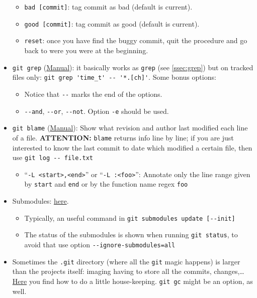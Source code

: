 \documentclass[a4paper,12pt,%
              final%
              ]{article}
\begin{document}
\begin{itemize}
\begin{itemize}
      \item \verb|bad [commit]|: tag commit as bad (default is current).
      \item \verb|good [commit]|: tag commit as good (default is current).
      \item \verb|reset|: once you have find the buggy commit, quit the procedure and go back to were you were at the beginning.
    \end{itemize}
  \item \verb|git grep| (\href{https://git-scm.com/docs/git-grep}{Manual}): it basically works as \verb|grep| (see \autoref{ssec:grep}) but on tracked files only: \verb|git grep 'time_t' -- '*.[ch]'|. Some bonus options:
    \begin{itemize}
      \item Notice that \verb|--| marks the end of the options.
      \item \verb|--and|, \verb|--or|, \verb|--not|. Option \verb|-e| should be used.
    \end{itemize}
  \item \verb|git blame| (\href{https://git-scm.com/docs/git-blame}{Manual}): Show what revision and author last modified each line of a file. \textbf{ATTENTION:} \texttt{blame} returns info line by line; if you are just interested to know the last commit to date which modified a certain file, then use \verb|git log -- file.txt|
    \begin{itemize}
      \item ``\verb|-L <start>,<end>|'' or ``\verb|-L :<foo>|'': Annotate only the line range given by \verb|start| and \verb|end| or by the function name regex \verb|foo|
    \end{itemize}
  \item Submodules: \href{https://git-scm.com/book/en/v2/Git-Tools-Submodules}{here}.
    \begin{itemize}
      \item Typically, an useful command in \verb|git submodules update [--init]|
      \item The status of the submodules is shown when running \verb|git status|, to avoid that use option \verb|--ignore-submodules=all|
    \end{itemize}
  \item Sometimes the \texttt{.git} directory (where all the \texttt{git} magic happens) is larger than the projects itself: imaging having to store all the commits, changes,\ldots{} \href{https://stackoverflow.com/questions/5277467/how-can-i-clean-my-git-folder-cleaned-up-my-project-directory-but-git-is-sti}{Here} you find how to do a little house-keeping. \verb|git gc| might be an option, as well.

\end{itemize}
\end{document}
